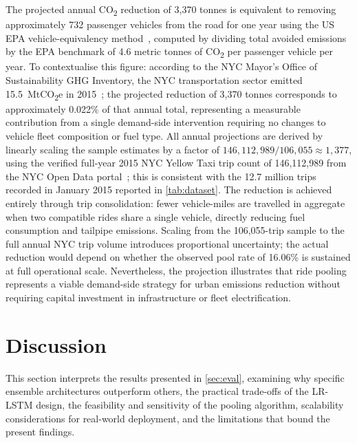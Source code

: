 \documentclass[a4paper,fleqn]{cas-dc}
\begin{document}
The projected annual CO\textsubscript{2} reduction of 3,370 tonnes is equivalent to removing approximately 732 passenger vehicles from the road for one year using the US EPA vehicle-equivalency method~\cite{epa_equivalencies}, computed by dividing total avoided emissions by the EPA benchmark of 4.6 metric tonnes of CO\textsubscript{2} per passenger vehicle per year.  To contextualise this figure: according to the NYC Mayor's Office of Sustainability GHG Inventory, the NYC transportation sector emitted 15.5~MtCO\textsubscript{2}e in 2015~\cite{nyc_ghg_2015}; the projected reduction of 3,370 tonnes corresponds to approximately 0.022\% of that annual total, representing a measurable contribution from a single demand-side intervention requiring no changes to vehicle fleet composition or fuel type.  All annual projections are derived by linearly scaling the sample estimates by a factor of $146{,}112{,}989 / 106{,}055 \approx 1{,}377$, using the verified full-year 2015 NYC Yellow Taxi trip count of 146,112,989 from the NYC Open Data portal~\cite{nyc_opendata_2015}; this is consistent with the 12.7 million trips recorded in January 2015 reported in \autoref{tab:dataset}.  The reduction is achieved entirely through trip consolidation: fewer vehicle-miles are travelled in aggregate when two compatible rides share a single vehicle, directly reducing fuel consumption and tailpipe emissions.  Scaling from the 106,055-trip sample to the full annual NYC trip volume introduces proportional uncertainty; the actual reduction would depend on whether the observed pool rate of 16.06\% is sustained at full operational scale.  Nevertheless, the projection illustrates that ride pooling represents a viable demand-side strategy for urban emissions reduction without requiring capital investment in infrastructure or fleet electrification.

\section{Discussion}
\label{sec:discussion}

This section interprets the results presented in \autoref{sec:eval}, examining why specific ensemble architectures outperform others, the practical trade-offs of the LR-LSTM design, the feasibility and sensitivity of the pooling algorithm, scalability considerations for real-world deployment, and the limitations that bound the present findings.
\end{document}
